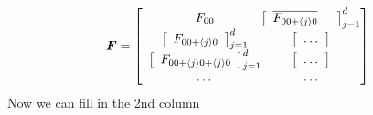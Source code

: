 \begin{equation}
  \begin{split}
    \bm{F} = 
    \left[
          \begin{array}{c@{}c@{}c}
            F_{00}
            &
            \left[
             \begin{array}{cccc}
               \overline{F_{00 + \langle j \rangle 0}}  &
            \end{array}
          \right]_{j=1}^d
            \\
           \left[
             \begin{array}{cc}
               F_{00 + \langle j \rangle 0}  \\
            \end{array}
          \right]_{j=1}^d 
            & 
           \left[
             \begin{array}{cc}
               \dots                            \\
            \end{array}
          \right] 
             \\ 
            \left[\begin{array}{ccc}
               F_{00 + \langle j \rangle 0 + \langle j \rangle 0}  \\
           \end{array}\right]_{j=1}^d
            & 
           \left[
             \begin{array}{cc}
               \dots                            \\
            \end{array}
          \right] 
\\
          \dots & \dots   
      \end{array}\right]
  \end{split}
\end{equation}
Now we can fill in the 2nd column
